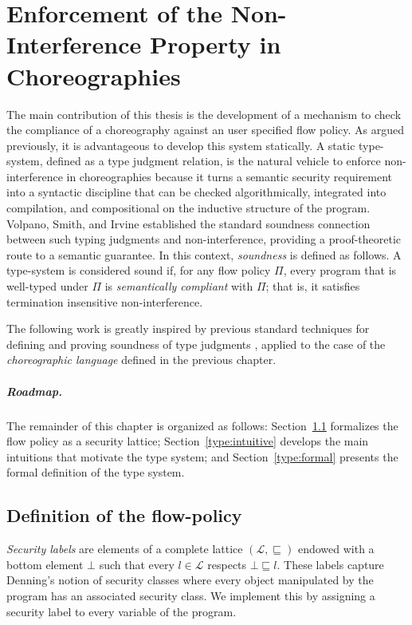 \documentclass[12pt,a4paper,twoside]{book}
\begin{document}
\chapter{Enforcement of the Non-Interference Property in Choreographies}
\label{chap:type-system}
The main contribution of this thesis is the development of a mechanism to check the compliance of a choreography against an user specified flow policy.
As argued previously, it is advantageous to develop this system statically.
A static type-system, defined as a type judgment relation, is the natural vehicle to enforce non-interference in choreographies because it turns a semantic security requirement into a syntactic discipline that can be checked algorithmically, integrated into compilation, and compositional on the inductive structure of the program.
Volpano, Smith, and Irvine\cite{volpano1996sound} established the standard soundness connection between such typing judgments and non-interference, providing a proof-theoretic route to a semantic guarantee. In this context, \textit{soundness} is defined as follows.
A type-system is considered sound if, for any flow policy $\Pi$, every program that is well-typed under $\Pi$ is \textit{semantically compliant} with $\Pi$; that is, it satisfies termination insensitive non-interference.

The following work is greatly inspired by previous standard techniques for defining and proving soundness of type judgments \cite{myers2011proving}\cite{wright1994syntactic}, applied to the case of the \emph{choreographic language} defined in the previous chapter.

\paragraph{Roadmap.}
The remainder of this chapter is organized as follows: Section~\ref{type:flow-policy} formalizes the flow policy as a security lattice; Section~\ref{type:intuitive} develops the main intuitions that motivate the type system; and Section~\ref{type:formal} presents the formal definition of the type system.

\section{Definition of the flow-policy}
\label{type:flow-policy}
\textit{Security labels} are elements of a complete lattice $(\mathscr{L}, \sqsubseteq)$ endowed with a bottom element $\bot$ such that every $l \in \mathscr{L}$ respects $\bot \sqsubseteq l$.
These labels capture Denning's notion of security classes where every object manipulated by the program has an associated security class. We implement this by assigning a security label to every variable of the program.
\end{document}
